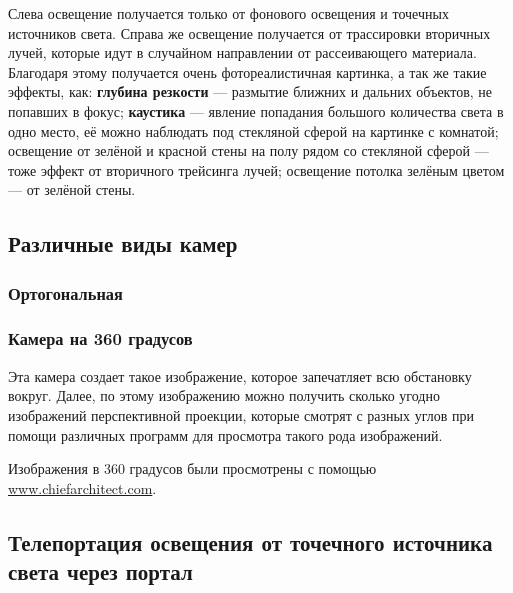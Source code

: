 Слева освещение получается только от фонового освещения и точечных источников света. Справа же освещение получается от трассировки вторичных лучей, которые идут в случайном направлении от рассеивающего материала. Благодаря этому получается очень фотореалистичная картинка, а так же такие эффекты, как: \textbf{глубина резкости} --- размытие ближних и дальних объектов, не попавших в фокус; \textbf{каустика} --- явление попадания большого количества света в одно место, её можно наблюдать под стекляной сферой на картинке с комнатой; освещение от зелёной и красной стены на полу рядом со стекляной сферой --- тоже эффект от вторичного трейсинга лучей; освещение потолка зелёным цветом --- от зелёной стены.

\subsection{Различные виды камер}

\subsubsection{Ортогональная}


\subsubsection{Камера на 360 градусов}

Эта камера создает такое изображение, которое запечатляет всю обстановку вокруг. Далее, по этому изображению можно получить сколько угодно изображений перспективной проекции, которые смотрят с разных углов при помощи различных программ для просмотра такого рода изображений.

Изображения в 360 градусов были просмотрены с помощью \href{https://www.chiefarchitect.com/products/360-panorama-viewer/}{www.chiefarchitect.com}.





\subsection{Телепортация освещения от точечного источника света через портал}

